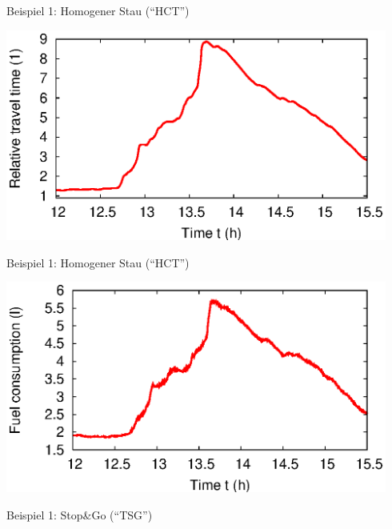\documentclass[a4paper]{foils}
\begin{document}
\centerline{Beispiel 1: Homogener Stau (``HCT'')}

\hspace{0.11\textwidth}
\includegraphics[width=0.94\textwidth]
 {figsAllg/F_0408_1.ASM.tseries.tt_delay.engl.eps}   

\newpage
\centerline{Beispiel 1: Homogener Stau (``HCT'')}

\hspace{0.11\textwidth}
\includegraphics[width=0.94\textwidth]
 {figsAllg/F_0408_1.ASM.tseries.fuel.engl.eps}   

\newpage
\centerline{Beispiel 1: Stop\&Go (``TSG'')}
\end{document}
